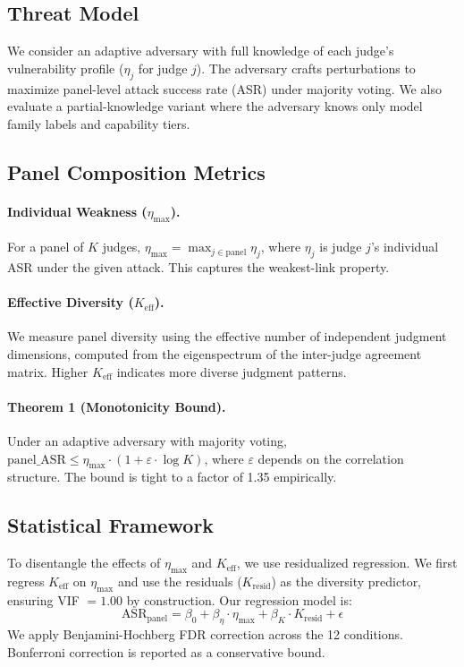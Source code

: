 \documentclass[11pt,a4paper]{article}
\newcommand{\keff}{K_{\text{eff}}}
\newcommand{\etamax}{\eta_{\max}}
\newcommand{\kresid}{K_{\text{resid}}}
\newcommand{\asr}{\text{ASR}}
\begin{document}
\subsection{Threat Model}

We consider an adaptive adversary with full knowledge of each judge's vulnerability profile ($\eta_j$ for judge $j$). The adversary crafts perturbations to maximize panel-level attack success rate (ASR) under majority voting. We also evaluate a partial-knowledge variant where the adversary knows only model family labels and capability tiers.

\subsection{Panel Composition Metrics}

\paragraph{Individual Weakness ($\etamax$).} For a panel of $K$ judges, $\etamax = \max_{j \in \text{panel}} \eta_j$, where $\eta_j$ is judge $j$'s individual ASR under the given attack. This captures the weakest-link property.

\paragraph{Effective Diversity ($\keff$).} We measure panel diversity using the effective number of independent judgment dimensions, computed from the eigenspectrum of the inter-judge agreement matrix. Higher $\keff$ indicates more diverse judgment patterns.

\paragraph{Theorem 1 (Monotonicity Bound).} Under an adaptive adversary with majority voting, $\text{panel\_ASR} \leq \etamax \cdot (1 + \varepsilon \cdot \log K)$, where $\varepsilon$ depends on the correlation structure. The bound is tight to a factor of 1.35 empirically.

\subsection{Statistical Framework}

To disentangle the effects of $\etamax$ and $\keff$, we use residualized regression. We first regress $\keff$ on $\etamax$ and use the residuals ($\kresid$) as the diversity predictor, ensuring VIF $= 1.00$ by construction. Our regression model is:
\begin{equation}
    \asr_{\text{panel}} = \beta_0 + \beta_\eta \cdot \etamax + \beta_K \cdot \kresid + \epsilon
\end{equation}
We apply Benjamini-Hochberg FDR correction across the 12 conditions. Bonferroni correction is reported as a conservative bound.
\end{document}
